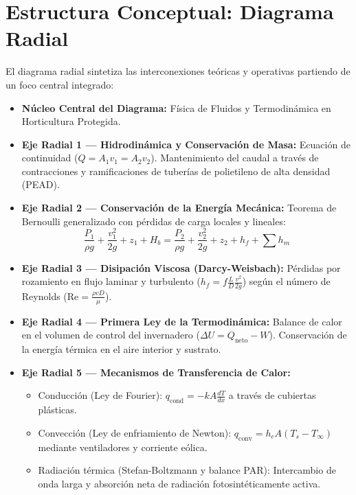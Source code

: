\documentclass[spanish,letterpaper,oneside]{article}
\begin{document}
\section{Estructura Conceptual: Diagrama Radial}
El diagrama radial sintetiza las interconexiones teóricas y operativas partiendo de un foco central integrado:
\begin{itemize}
    \item \textbf{Núcleo Central del Diagrama:} Física de Fluidos y Termodinámica en Horticultura Protegida.
    \item \textbf{Eje Radial 1 --- Hidrodinámica y Conservación de Masa:} Ecuación de continuidad ($Q = A_1 v_1 = A_2 v_2$). Mantenimiento del caudal a través de contracciones y ramificaciones de tuberías de polietileno de alta densidad (PEAD).
    \item \textbf{Eje Radial 2 --- Conservación de la Energía Mecánica:} Teorema de Bernoulli generalizado con pérdidas de carga locales y lineales:
    \begin{equation}
        \frac{P_1}{\rho g} + \frac{v_1^2}{2g} + z_1 + H_b = \frac{P_2}{\rho g} + \frac{v_2^2}{2g} + z_2 + h_f + \sum h_m
    \end{equation}
    \item \textbf{Eje Radial 3 --- Disipación Viscosa (Darcy-Weisbach):} Pérdidas por rozamiento en flujo laminar y turbulento ($h_f = f \frac{L}{D} \frac{v^2}{2g}$) según el número de Reynolds ($\mathrm{Re} = \frac{\rho v D}{\mu}$).
    \item \textbf{Eje Radial 4 --- Primera Ley de la Termodinámica:} Balance de calor en el volumen de control del invernadero ($\Delta U = Q_{\text{neto}} - W$). Conservación de la energía térmica en el aire interior y sustrato.
    \item \textbf{Eje Radial 5 --- Mecanismos de Transferencia de Calor:}
    \begin{itemize}
        \item Conducción (Ley de Fourier): $q_{\text{cond}} = -k A \frac{dT}{dx}$ a través de cubiertas plásticas.
        \item Convección (Ley de enfriamiento de Newton): $q_{\text{conv}} = h_c A (T_s - T_\infty)$ mediante ventiladores y corriente eólica.
        \item Radiación térmica (Stefan-Boltzmann y balance PAR): Intercambio de onda larga y absorción neta de radiación fotosintéticamente activa.
    \end{itemize}
\end{itemize}
\end{document}
